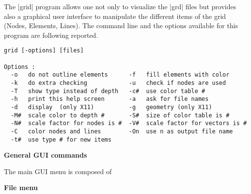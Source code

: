 
The |grid| program allows one not only to visualize 
the |grd| files but provides also a graphical user interface 
to manipulate the different items of the grid (Nodes, Elements, Lines).
The command line and the options available for this program are following reported.

\begin{verbatim}
grid [-options] [files] 

Options :
  -o   do not outline elements      -f   fill elements with color     
  -k   do extra checking            -u   check if nodes are used      
  -T   show type instead of depth   -c#  use color table #            
  -h   print this help screen       -a   ask for file names           
  -d   display  (only X11)          -g   geometry (only X11)          
  -M#  scale color to depth #       -S#  size of color table is #     
  -N#  scale factor for nodes is #  -V#  scale factor for vectors is #
  -C   color nodes and lines        -On  use n as output file name    
  -t#  use type # for new items
\end{verbatim}

\textbf{General GUI commands}

\par
{}
\par
{}
\par
{}
\par
{}
\par

The main GUI menu is composed of

\par
{}\par
{}\par
{}\par
{}\par
{}\par
{}\par

\textbf{File menu}

\par
{}
\par
{}
\par
{}
\par
{}
\par

